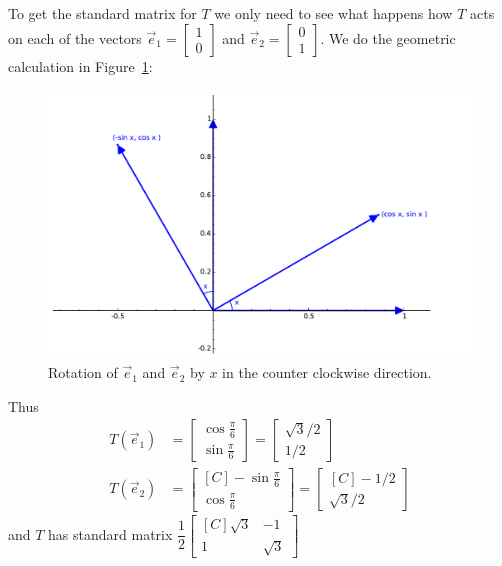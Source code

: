 \begin{example}
To get the standard matrix for $T$ we only need to see what happens how $T$ acts on each of the vectors 
$\vec{e}_1=\begin{bmatrix}1 \\ 0 \end{bmatrix}$ and $\vec{e}_2=\begin{bmatrix}0 \\ 1 \end{bmatrix}$. We do the geometric calculation in Figure~\ref{fig:2drotation}:
\begin{figure}[H]
\begin{center}
\includegraphics[scale=.66]{Rn/rotation.pdf}
\caption{Rotation of $\vec{e}_1$ and $\vec{e}_2$ by $x$ in the counter clockwise direction.}
\label{fig:2drotation}
\end{center}
\end{figure}
Thus 
\begin{align*}
T(\vec{e}_1)&=\begin{bmatrix} \cos \frac{\pi}{6} \\ \sin \frac{\pi}{6}\end{bmatrix}
=\begin{bmatrix} \sqrt{3}/2 \\ 1/2\end{bmatrix}\\
T(\vec{e}_2)&=\begin{bmatrix*}[C] -\sin \frac{\pi}{6} \\ \cos \frac{\pi}{6}\end{bmatrix*}
=\begin{bmatrix*}[C] -1/2 \\ \sqrt{3}/2\end{bmatrix*}
\end{align*}
and $T$ has standard matrix $\dfrac{1}{2}\begin{bmatrix*}[C]\sqrt{3} & -1 \\ 1 & \sqrt{3}\end{bmatrix*}$
\end{example}


